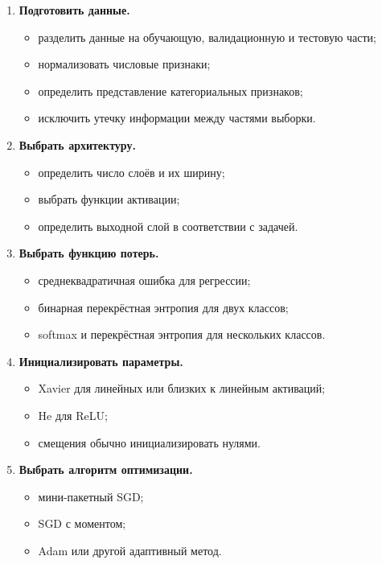 \documentclass[12pt,a4paper]{article}
\theoremstyle{plain}
\theoremstyle{definition}
\theoremstyle{remark}
\begin{document}
\begin{enumerate}
    \item \textbf{Подготовить данные.}
    \begin{itemize}
        \item разделить данные на обучающую, валидационную и
        тестовую части;
        \item нормализовать числовые признаки;
        \item определить представление категориальных признаков;
        \item исключить утечку информации между частями выборки.
    \end{itemize}

    \item \textbf{Выбрать архитектуру.}
    \begin{itemize}
        \item определить число слоёв и их ширину;
        \item выбрать функции активации;
        \item определить выходной слой в соответствии с задачей.
    \end{itemize}

    \item \textbf{Выбрать функцию потерь.}
    \begin{itemize}
        \item среднеквадратичная ошибка для регрессии;
        \item бинарная перекрёстная энтропия для двух классов;
        \item softmax и перекрёстная энтропия для нескольких классов.
    \end{itemize}

    \item \textbf{Инициализировать параметры.}
    \begin{itemize}
        \item Xavier для линейных или близких к линейным активаций;
        \item He для ReLU;
        \item смещения обычно инициализировать нулями.
    \end{itemize}

    \item \textbf{Выбрать алгоритм оптимизации.}
    \begin{itemize}
        \item мини-пакетный SGD;
        \item SGD с моментом;
        \item Adam или другой адаптивный метод.
    \end{itemize}


\end{enumerate}
\end{document}
